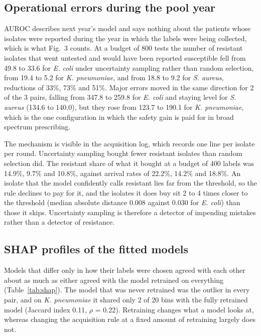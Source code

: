 \documentclass[conference,a4paper]{IEEEtran}
\begin{document}
\subsection{Operational errors during the pool year}


AUROC describes next year's model and says nothing about the patients whose isolates were reported during the year in which the labels were being collected, which is what Fig.~3 counts. At a budget of 800 tests the number of resistant isolates that went untested and would have been reported susceptible fell from 49.8 to 33.6 for \textit{E. coli} under uncertainty sampling rather than random selection, from 19.4 to 5.2 for \textit{K. pneumoniae}, and from 18.8 to 9.2 for \textit{S. aureus}, reductions of 33\%, 73\% and 51\%. Major errors moved in the same direction for 2 of the 3 pairs, falling from 347.8 to 259.8 for \textit{E. coli} and staying level for \textit{S. aureus} (134.6 to 140.0), but they rose from 123.7 to 190.1 for \textit{K. pneumoniae}, which is the one configuration in which the safety gain is paid for in broad spectrum prescribing.

The mechanism is visible in the acquisition log, which records one line per isolate per round. Uncertainty sampling bought fewer resistant isolates than random selection did. The resistant share of what it bought at a budget of 400 labels was 14.9\%, 9.7\% and 10.8\%, against arrival rates of 22.2\%, 14.2\% and 18.8\%. An isolate that the model confidently calls resistant lies far from the threshold, so the rule declines to pay for it, and the isolates it does buy sit 2 to 4 times closer to the threshold (median absolute distance 0.008 against 0.030 for \textit{E. coli}) than those it skips. Uncertainty sampling is therefore a detector of impending mistakes rather than a detector of resistance.

\subsection{SHAP profiles of the fitted models}

Models that differ only in how their labels were chosen agreed with each other about as much as either agreed with the model retrained on everything (Table~\ref{tab:shap}). The model that was never retrained was the outlier in every pair, and on \textit{K. pneumoniae} it shared only 2 of 20 bins with the fully retrained model (Jaccard index 0.11, $\rho$ = 0.22). Retraining changes what a model looks at, whereas changing the acquisition rule at a fixed amount of retraining largely does not.
\end{document}
